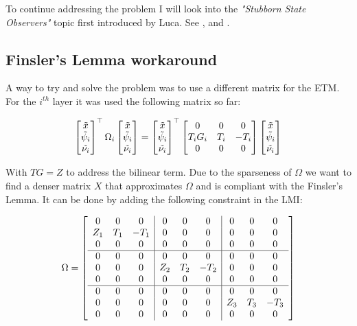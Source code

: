 \documentclass{article}
\begin{document}
  To continue addressing the problem I will look into the \textit{"Stubborn State Observers"} topic first introduced by Luca. See \cite{stubborn-1}, \cite{stubborn-2} and \cite{stubborn-3}.

  \subsection*{Finsler's Lemma workaround}
  
  A way to try and solve the problem was to use a different matrix for the ETM. For the $i^{th}$ layer it was used the following matrix so far:

  $$    
    \left[\begin{matrix}
      \tilde{x}\\
      \tilde{\psi_{i}}\\
      \tilde{\nu_{i}}
    \end{matrix}\right]^\top
    \Omega_{i}
    \left[\begin{matrix}
      \tilde{x}\\
      \tilde{\psi_{i}}\\
      \tilde{\nu_{i}}
    \end{matrix}\right] = \left[\begin{matrix}
      \tilde{x}\\
      \tilde{\psi_{i}}\\
      \tilde{\nu_{i}}
    \end{matrix}\right]^\top
    \left[\begin{matrix}
      0 & 0 & 0\\
      T_{i} G_{i} & T_{i} & -T_{i}\\
      0 & 0 & 0 
    \end{matrix}\right]
    \left[\begin{matrix}
      \tilde{x}\\
      \tilde{\psi_{i}}\\
      \tilde{\nu_{i}}
    \end{matrix}\right]
  $$

  With $TG = Z$ to address the bilinear term. Due to the sparseness of $\Omega$ we want to find a denser matrix $X$ that approximates $\Omega$ and is compliant with the Finsler's Lemma. It can be done by adding the following constraint in the LMI:

  $$
  \Omega = \left[\begin{matrix}
    \begin{array}{ccc|ccc|ccc}
      0 & 0 & 0 & 0 & 0 & 0 & 0 & 0 & 0\\
      Z_{1} & T_{1} & -T_{1} & 0 & 0 & 0 & 0 & 0 & 0\\
      0 & 0 & 0 & 0 & 0 & 0 & 0 & 0 & 0\\
      \hline
      0 & 0 & 0 & 0 & 0 & 0 & 0 & 0 & 0\\
      0 & 0 & 0 & Z_{2} & T_{2} & -T_{2} & 0 & 0 & 0\\
      0 & 0 & 0 & 0 & 0 & 0 & 0 & 0 & 0\\
      \hline
      0 & 0 & 0 & 0 & 0 & 0 & 0 & 0 & 0\\
      0 & 0 & 0 & 0 & 0 & 0 & Z_{3} & T_{3} & -T_{3}\\
      0 & 0 & 0 & 0 & 0 & 0 & 0 & 0 & 0\\
    \end{array}
  \end{matrix}\right]
$$
\end{document}
